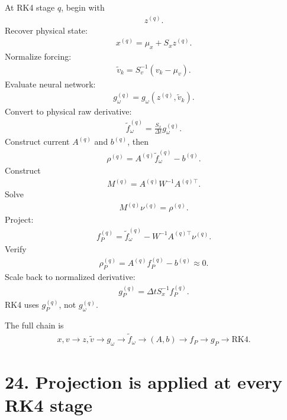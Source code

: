 \documentclass[11pt]{article}
\begin{document}
At RK4 stage \(q\), begin with
\begin{align}
\boxed{z^{(q)}.}
\tag{E5.82}
\end{align}
Recover physical state:
\begin{align}
\boxed{x^{(q)}=\mu_x+S_xz^{(q)}.}
\tag{E5.83}
\end{align}
Normalize forcing:
\begin{align}
\boxed{\widetilde v_k=S_v^{-1}(v_k-\mu_v).}
\tag{E5.84}
\end{align}
Evaluate neural network:
\begin{align}
\boxed{g_\omega^{(q)}=g_\omega(z^{(q)},\widetilde v_k).}
\tag{E5.85}
\end{align}
Convert to physical raw derivative:
\begin{align}
\boxed{\widetilde f_\omega^{(q)}=\frac{S_x}{\Delta t}g_\omega^{(q)}.}
\tag{E5.86}
\end{align}
Construct current \(A^{(q)}\) and \(b^{(q)}\), then
\begin{align}
\boxed{\rho^{(q)}=A^{(q)}\widetilde f_\omega^{(q)}-b^{(q)}.}
\tag{E5.87}
\end{align}
Construct
\begin{align}
\boxed{M^{(q)}=A^{(q)}W^{-1}A^{(q)\top}.}
\tag{E5.88}
\end{align}
Solve
\begin{align}
\boxed{M^{(q)}\nu^{(q)}=\rho^{(q)}.}
\tag{E5.89}
\end{align}
Project:
\begin{align}
\boxed{f_P^{(q)}=\widetilde f_\omega^{(q)}-W^{-1}A^{(q)\top}\nu^{(q)}.}
\tag{E5.90}
\end{align}
Verify
\begin{align}
\boxed{\rho_P^{(q)}=A^{(q)}f_P^{(q)}-b^{(q)}\approx0.}
\tag{E5.91}
\end{align}
Scale back to normalized derivative:
\begin{align}
\boxed{g_P^{(q)}=\Delta tS_x^{-1}f_P^{(q)}.}
\tag{E5.92}
\end{align}
RK4 uses \(g_P^{(q)}\), not \(g_\omega^{(q)}\).

The full chain is
\begin{align}
\boxed{x,v\rightarrow z,\widetilde v\rightarrow g_\omega\rightarrow\widetilde f_\omega\rightarrow(A,b)\rightarrow f_P\rightarrow g_P\rightarrow\text{RK4}.}
\tag{E5.93}
\end{align}

\section*{24. Projection is applied at every RK4 stage}
\end{document}
